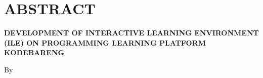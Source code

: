 \clearpage
\chapter*{ABSTRACT}

\begin{center}
  \center
  \begin{singlespace}
    \bfseries \MakeUppercase{Development of Interactive Learning Environment (ILE) on Programming Learning Platform KodeBareng}

    \normalfont\normalsize
    By

    \bfseries \theauthor
  \end{singlespace}
\end{center}


